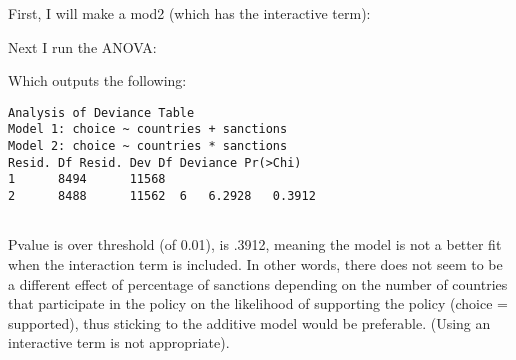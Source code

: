 \documentclass[12pt,letterpaper]{article}
\begin{document}
\begin{enumerate}
\begin{enumerate}
First, I will make a mod2 (which has the interactive term):

 	

Next I run the ANOVA:
 	

Which outputs the following:
\begin{verbatim}
Analysis of Deviance Table
Model 1: choice ~ countries + sanctions
Model 2: choice ~ countries * sanctions  
Resid. Df Resid. Dev Df Deviance Pr(>Chi)
1      8494      11568                     
2      8488      11562  6   6.2928   0.3912	
	
\end{verbatim}

Pvalue is over threshold (of 0.01), is .3912, meaning the model is not a better fit when the interaction term is included. In other words, there does not seem to be a different effect of percentage of sanctions depending on the number of countries that participate in the policy on the likelihood of supporting the policy (choice = supported), thus sticking to the additive model would be preferable. (Using an interactive term is not appropriate).


\end{enumerate}
	\end{enumerate}
\end{document}
